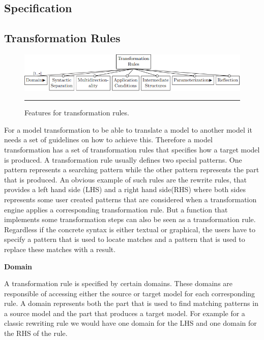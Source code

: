 \subsection{Specification}



\subsection{Transformation Rules}

\begin{figure}[H]
  \centering
    \includegraphics[scale=0.65]{./Figures/TransformationRules_1.png}
    \rule{35em}{0.5pt}
  \caption[Feature diagram for transformation rules]
  {Features for transformation rules.}
  \label{fig:TransformationRules}
\end{figure}

For a model transformation to be able to translate a model to another model it
needs a set of guidelines on how to achieve this. Therefore a model
transformation has a set of transformation rules that specifies how a target
model is produced. A transformation rule usually defines two special patterns.
One pattern represents a searching pattern while the other pattern represents
the part that is produced.  An obvious example of such rules are the rewrite
rules, that provides a left hand side (LHS) and a right hand side(RHS) where
both sides represents some user created patterns that are considered when a
transformation engine applies a corresponding transformation rule. But a
function that implements some transformation steps can also be seen as a
transformation rule. Regardless if the concrete syntax is either textual or
graphical, the users have to specify a pattern that is used to locate matches
and a pattern that is used to replace these matches with a result.

\textbf{Domain}

A transformation rule is specified by certain domains. These domains are
responsible of accessing either the source or target model for each
corresponding rule. A domain represents both the part that is used to find
matching patterns in a source model and the part that produces a target model.
For example for a classic rewriting rule we would have one domain for the LHS
and one domain for the RHS of the rule. 


